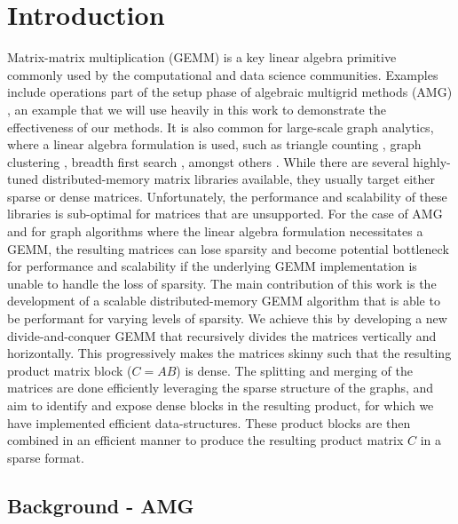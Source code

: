 \section{Introduction}
\label{sec:intro}


Matrix-matrix multiplication (\textsc{GEMM}) is a key linear algebra primitive commonly used by the computational and data science communities. Examples include operations part of the setup phase of algebraic multigrid methods (AMG) \cite{Dendy82}, an example that we will use heavily in this work to demonstrate the effectiveness of our methods. It is also common for large-scale graph analytics, where a linear algebra formulation is used, such as triangle counting \cite{azad2015parallel}, graph clustering \cite{van2000graph}, breadth first search \cite{gilbert2008unified}, amongst others \cite{kepner2011graph}. 
While there are several highly-tuned distributed-memory matrix libraries available, they usually target either sparse \cite{petsc, combblas} or dense \cite{elemental} matrices. Unfortunately, the performance and scalability of these libraries is sub-optimal for matrices that are unsupported. For the case of AMG and for graph algorithms where the linear algebra formulation necessitates a \textsc{GEMM}, the resulting matrices can lose sparsity and become potential bottleneck for performance and scalability if the underlying \textsc{GEMM} implementation is unable to handle the loss of sparsity. The main contribution of this work is the development of a scalable distributed-memory \textsc{GEMM} algorithm that is able to be performant for varying levels of sparsity. 
We achieve this by developing a new divide-and-conquer \textsc{GEMM} that recursively divides the matrices vertically and horizontally. This progressively makes the matrices skinny such that the resulting product matrix block ($C = AB$) is dense. The splitting and merging of the matrices are done efficiently leveraging the sparse structure of the graphs, and aim to identify and expose dense blocks in the resulting product, for which we have implemented efficient data-structures. These product blocks are then combined in an efficient manner to produce the resulting product matrix $C$ in a sparse format. 






\subsection{Background - AMG}
\label{sec:bg}

